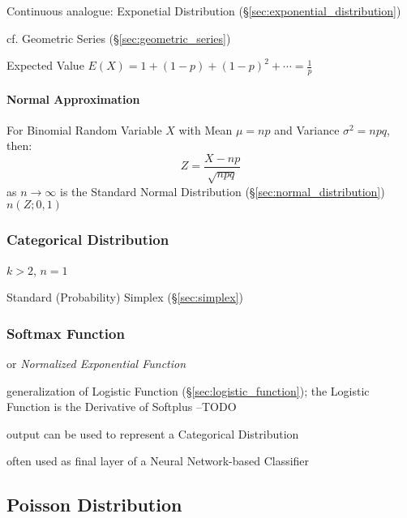 \fist Continuous analogue: Exponetial Distribution
(\S\ref{sec:exponential_distribution})

cf. Geometric Series (\S\ref{sec:geometric_series})

Expected Value $E(X) = 1 + (1-p) + (1-p)^2 + \cdots = \frac{1}{p}$



\paragraph{Normal Approximation}\label{sec:normal_approximation}\hfill

For Binomial Random Variable $X$ with Mean $\mu = np$ and Variance
$\sigma^2 = npq$, then:
\[
  Z = \frac{X - np}{\sqrt{npq}}
\]
as $n \to \infty$ is the Standard Normal Distribution
(\S\ref{sec:normal_distribution}) $n(Z;0,1)$



\subsubsection{Categorical Distribution}\label{sec:categorical_distribution}

$k > 2$, $n = 1$

Standard (Probability) Simplex (\S\ref{sec:simplex})



\subsubsection{Softmax Function}\label{sec:softmax}

or \emph{Normalized Exponential Function}

generalization of Logistic Function (\S\ref{sec:logistic_function}); the
Logistic Function is the Derivative of Softplus --TODO

output can be used to represent a Categorical Distribution

often used as final layer of a Neural Network-based Classifier



\subsection{Poisson Distribution}\label{sec:poisson_distribution}

